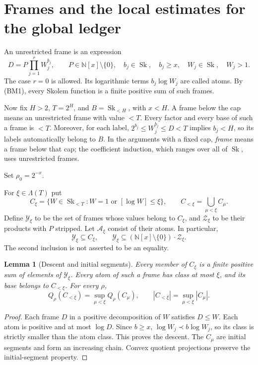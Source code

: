 \documentclass[11pt]{article}
\newtheorem{lemma}[theorem]{Lemma}
\theoremstyle{definition}
\theoremstyle{remark}
\newcommand{\Sk}{\operatorname{Sk}}
\newcommand{\N}{\mathbb N}
\newcommand{\Lam}{\Lambda}
\newcommand{\Acal}{\mathcal A}
\newcommand{\Ycal}{\mathcal Y}
\newcommand{\Zcal}{\mathcal Z}
\numberwithin{equation}{section}
\begin{document}
\section{Frames and the local estimates for the global ledger}

An unrestricted frame is an expression
\[
 D=P\prod_{j=1}^r W_j^{b_j},\qquad
 P\in\N[x]\setminus\{0\},\quad
 b_j\in\Sk,\quad b_j\ge x,\quad
 W_j\in\Sk,\quad W_j>1.
\]
The case $r=0$ is allowed. Its logarithmic terms $b_j\log W_j$
are called atoms. By (BM1), every Skolem function is a finite
positive sum of such frames.

Now fix $H>2$, $T=2^H$, and $B=\Sk_{<H}$, with $x<H$.
A frame below the cap means an unrestricted frame with value $<T$.
Every factor and every base of such a frame is $<T$. Moreover,
for each label, $2^{b_j}\le W_j^{b_j}\le D<T$ implies $b_j<H$,
so its labels automatically belong to $B$.
In the arguments with a fixed cap, \emph{frame} means a frame below
that cap; the coefficient induction, which ranges over all of
$\Sk$, uses unrestricted frames.

Set $\rho_0=2^{-x}$.

For $\xi\in\Lam(T)$ put
\[
 C_\xi=\{W\in\Sk_{<T}:W=1\text{ or }[\log W]\le\xi\},
 \qquad C_{<\xi}=\bigcup_{\mu<\xi}C_\mu.
\]
Define $\Ycal_\xi$ to be the set of frames whose values belong to
$C_\xi$, and $\Zcal_\xi$ to be their products with $P$ stripped.
Let $\Acal_\xi$ consist of their atoms.  In particular,
\begin{equation}
 \Ycal_\xi\subseteq C_\xi,\qquad
 \Ycal_\xi\subseteq(\N[x]\setminus\{0\})\cdot\Zcal_\xi.
 \label{g-eq-3.1}
\end{equation}
The second inclusion is not asserted to be an equality.

\begin{lemma}[Descent and initial segments]\label{g-lem:descent}
Every member of $C_\xi$ is a finite positive sum of elements of
$\Ycal_\xi$.  Every atom of such a frame has class at most $\xi$,
and its base belongs to $C_{<\xi}$.  For every $\rho$,
\[
 Q_\rho(C_{<\xi})=\sup_{\mu<\xi}Q_\rho(C_\mu),\qquad
 |C_{<\xi}|=\sup_{\mu<\xi}|C_\mu|.
\]
\end{lemma}
\begin{proof}
Each frame $D$ in a positive decomposition of $W$ satisfies $D\le W$.
Each atom is positive and at most $\log D$.
Since $b\ge x$,
$\log W_j\prec b\log W_j$, so its class is strictly smaller
than the atom class.  This proves the descent.
The $C_\mu$ are initial segments and form an increasing chain.
Convex quotient projections preserve the initial-segment property.
\end{proof}
\end{document}
